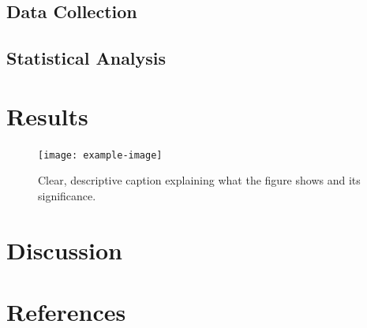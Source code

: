 \subsection{Data Collection}

\subsection{Statistical Analysis}

\section{Results}
\lipsum[2]  %


\begin{figure}[htbp]
    \centering
    \texttt{[image: example-image]}
    \caption{Clear, descriptive caption explaining what the figure shows and its significance.}
\end{figure}

\section{Discussion}
\lipsum[3]  %

\section{References}
